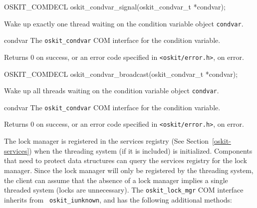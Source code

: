 \begin{apisyn}

	\funcproto OSKIT_COMDECL
	oskit_condvar_signal(oskit_condvar_t *condvar);
\end{apisyn}
\begin{apidesc}
	Wake up exactly one thread waiting on the condition variable object
	{\tt condvar}.
\end{apidesc}
\begin{apiparm}
	\item[condvar]
		The {\tt oskit_condvar} COM interface for the condition
		variable.
\end{apiparm}
\begin{apiret}
	Returns 0 on success, or an error code specified in
	{\tt <oskit/error.h>}, on error.
\end{apiret}

\begin{apisyn}

	\funcproto OSKIT_COMDECL
	oskit_condvar_broadcast(oskit_condvar_t *condvar);
\end{apisyn}
\begin{apidesc}
	Wake up all threads waiting on the condition variable object
	{\tt condvar}.
\end{apidesc}
\begin{apiparm}
	\item[condvar]
		The {\tt oskit_condvar} COM interface for the condition
		variable.
\end{apiparm}
\begin{apiret}
	Returns 0 on success, or an error code specified in
	{\tt <oskit/error.h>}, on error.
\end{apiret}


\label{lock-mgr}

The lock manager is registered in the services registry (See
Section~\ref{oskit-services}) when the threading system (if it is included)
is initialized. Components that need to protect data structures can query
the services registry for the lock manager. Since the lock manager will
only be registered by the threading system, the client can assume that the
absence of a lock manager implies a single threaded system (locks are
unnecessary). The {\tt oskit_lock_mgr} COM interface inherits from {\tt
oskit_iunknown}, and has the following additional methods:

